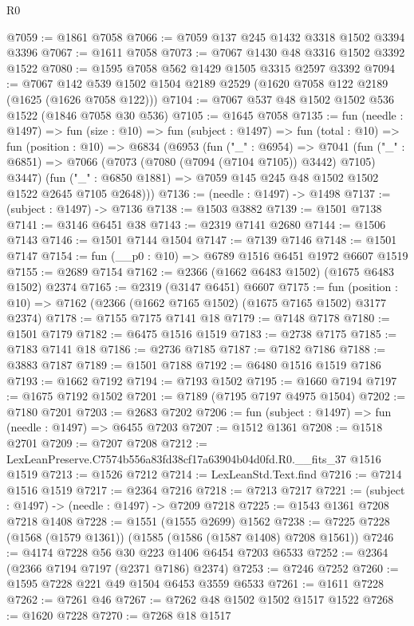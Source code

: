 \begin{lexlean}{R0}
\begin{coremodule}
@7059 := @1861 @7058
@7066 := @7059 @137 @245 @1432 @3318 @1502 @3394 @3396
@7067 := @1611 @7058
@7073 := @7067 @1430 @48 @3316 @1502 @3392 @1522
@7080 := @1595 @7058 @562 @1429 @1505 @3315 @2597 @3392
@7094 := @7067 @142 @539 @1502 @1504 @2189 @2529 (@1620 @7058 @122 @2189 (@1625 (@1626 @7058 @122)))
@7104 := @7067 @537 @48 @1502 @1502 @536 @1522 (@1846 @7058 @30 @536)
@7105 := @1645 @7058
@7135 := fun (needle : @1497) =>
  fun (size : @10) =>
  fun (subject : @1497) =>
  fun (total : @10) =>
  fun (position : @10) =>
  @6834
    (@6953
      (fun ("_" : @6954) =>
      @7041
        (fun ("_" : @6851) => @7066 (@7073 (@7080 (@7094 (@7104 @7105)) @3442) @7105) @3447)
        (fun ("_" : @6850 @1881) => @7059 @145 @245 @48 @1502 @1502 @1522 @2645 @7105 @2648)))
@7136 := (needle : @1497) -> @1498
@7137 := (subject : @1497) -> @7136
@7138 := @1503 @3882
@7139 := @1501 @7138
@7141 := @3146 @6451 @38
@7143 := @2319 @7141 @2680
@7144 := @1506 @7143
@7146 := @1501 @7144 @1504
@7147 := @7139 @7146
@7148 := @1501 @7147
@7154 := fun (__p0 : @10) => @6789 @1516 @6451 @1972 @6607 @1519
@7155 := @2689 @7154
@7162 := @2366 (@1662 @6483 @1502) (@1675 @6483 @1502) @2374
@7165 := @2319 (@3147 @6451) @6607
@7175 := fun (position : @10) => @7162 (@2366 (@1662 @7165 @1502) (@1675 @7165 @1502) @3177 @2374)
@7178 := @7155 @7175 @7141 @18
@7179 := @7148 @7178
@7180 := @1501 @7179
@7182 := @6475 @1516 @1519
@7183 := @2738 @7175
@7185 := @7183 @7141 @18
@7186 := @2736 @7185
@7187 := @7182 @7186
@7188 := @3883 @7187
@7189 := @1501 @7188
@7192 := @6480 @1516 @1519 @7186
@7193 := @1662 @7192
@7194 := @7193 @1502
@7195 := @1660 @7194
@7197 := @1675 @7192 @1502
@7201 := @7189 (@7195 @7197 @4975 @1504)
@7202 := @7180 @7201
@7203 := @2683 @7202
@7206 := fun (subject : @1497) => fun (needle : @1497) => @6455 @7203
@7207 := @1512 @1361
@7208 := @1518 @2701
@7209 := @7207 @7208
@7212 := LexLeanPreserve.C7574b556a83fd38cf17a63904b04d0fd.R0.__fits_37 @1516 @1519
@7213 := @1526 @7212
@7214 := LexLeanStd.Text.find
@7216 := @7214 @1516 @1519
@7217 := @2364 @7216
@7218 := @7213 @7217
@7221 := (subject : @1497) -> (needle : @1497) -> @7209 @7218
@7225 := @1543 @1361 @7208 @7218 @1408
@7228 := @1551 (@1555 @2699) @1562
@7238 := @7225 @7228 (@1568 (@1579 @1361)) (@1585 (@1586 (@1587 @1408) @7208 @1561))
@7246 := @4174 @7228 @56 @30 @223 @1406 @6454 @7203 @6533
@7252 := @2364 (@2366 @7194 @7197 (@2371 @7186) @2374)
@7253 := @7246 @7252
@7260 := @1595 @7228 @221 @49 @1504 @6453 @3559 @6533
@7261 := @1611 @7228
@7262 := @7261 @46
@7267 := @7262 @48 @1502 @1502 @1517 @1522
@7268 := @1620 @7228
@7270 := @7268 @18 @1517

\end{coremodule}
\end{lexlean}
